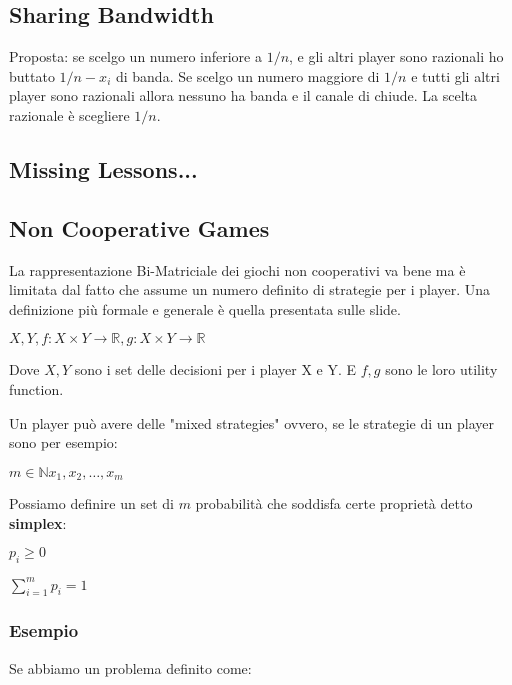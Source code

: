 \documentclass[10pt,a4paper]{report}
\begin{document}
        \subsection{Sharing Bandwidth}
        Proposta: se scelgo un numero inferiore a $1/n$, e gli altri player sono razionali ho buttato $1/n - x_i$ di banda.
        Se scelgo un numero maggiore di $1/n$ e tutti gli altri player sono razionali allora nessuno ha banda e il canale di chiude.
        La scelta razionale è scegliere $1/n$.

        \subsection{Missing Lessons...}

        \subsection{Non Cooperative Games}
        La rappresentazione Bi-Matriciale dei giochi non cooperativi va bene ma è limitata dal fatto che assume un numero definito di strategie per i player.
        Una definizione più formale e generale è quella presentata sulle slide.

        \begin{center}
            $X,Y,f: X \times Y \rightarrow \mathbb{R}, g: X \times Y \rightarrow \mathbb{R} $
        \end{center}

        Dove $X,Y$ sono i set delle decisioni per i player X e Y. E $f,g$ sono le loro utility function.
        
        Un player può avere delle "mixed strategies" ovvero, se le strategie di un player sono per esempio:
        \begin{center}
            $m \in \mathbb{N} {x_1,x_2,\dots,x_m}$
        \end{center}

        Possiamo definire un set di $m$ probabilità che soddisfa certe proprietà detto \textbf{simplex}:
        \begin{center}
            $p_i \ge 0$

            $\sum_{i = 1}^{m} p_i = 1$ 
        \end{center}

        \subsubsection{Esempio}
        Se abbiamo un problema definito come:
\end{document}
